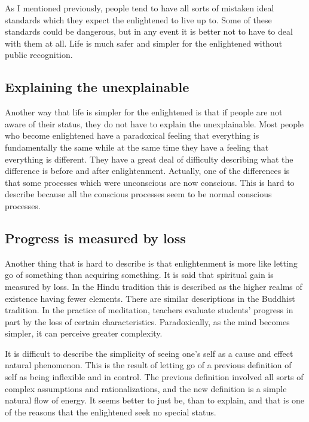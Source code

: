 \documentclass[a5paper,10pt,english]{book}
\begin{document}
\sphinxAtStartPar
As I mentioned previously, people tend to have all sorts of mistaken
ideal standards which they expect the enlightened to live up to. Some of
these standards could be dangerous, but in any event it is better not to
have to deal with them at all. Life is much safer and simpler
for the enlightened without public recognition.


\subsection{Explaining the unexplainable}
\label{\detokenize{saints:explaining-the-unexplainable}}
\sphinxAtStartPar
Another way that life is simpler for the enlightened is that if people
are not aware of their status, they do not have to explain the
unexplainable. Most people who become enlightened have a paradoxical
feeling that everything is fundamentally the same while at the same time
they have a feeling that everything is different. They have a great deal
of difficulty describing what the difference is before and after
enlightenment. Actually, one of the differences is that some processes
which were unconscious are now conscious. This is hard to describe
because all the conscious processes seem to be normal conscious
processes.


\subsection{Progress is measured by loss}
\label{\detokenize{saints:progress-is-measured-by-loss}}
\sphinxAtStartPar
Another thing that is hard to describe is that enlightenment is more
like letting go of something than acquiring something. It is said that
spiritual gain is measured by loss. In the Hindu tradition this is
described as the higher realms of existence having fewer elements. There
are similar descriptions in the Buddhist tradition. In the practice of
meditation, teachers evaluate students’ progress in part by the loss of
certain characteristics. Paradoxically, as the mind becomes simpler, it
can perceive greater complexity.

\sphinxAtStartPar
It is difficult to describe the simplicity of seeing one’s self as a
cause and effect natural phenomenon. This is the result of letting go of
a previous definition of self as being inflexible and in control. The
previous definition involved all sorts of complex assumptions and
rationalizations, and the new definition is a simple natural flow of
energy. It seems better to just be, than to explain, and that is one of
the reasons that the enlightened seek no special status.
\end{document}
